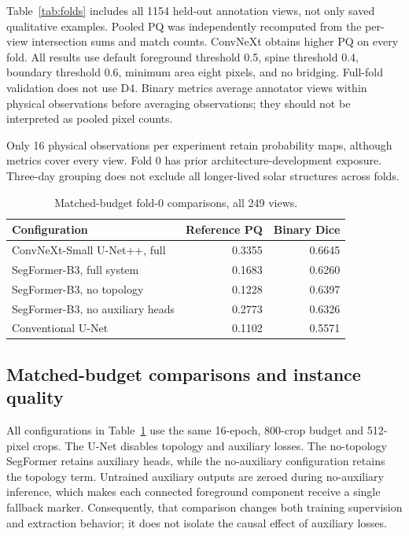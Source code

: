 \documentclass[conference]{IEEEtran}
\begin{document}
Table~\ref{tab:folds} includes all 1154 held-out annotation views, not only saved qualitative examples. Pooled PQ was independently recomputed from the per-view intersection sums and match counts. ConvNeXt obtains higher PQ on every fold. All results use default foreground threshold 0.5, spine threshold 0.4, boundary threshold 0.6, minimum area eight pixels, and no bridging. Full-fold validation does not use D4. Binary metrics average annotator views within physical observations before averaging observations; they should not be interpreted as pooled pixel counts.

Only 16 physical observations per experiment retain probability maps, although metrics cover every view. Fold 0 has prior architecture-development exposure. Three-day grouping does not exclude all longer-lived solar structures across folds.

\begin{table}[t]
\centering
\caption{Matched-budget fold-0 comparisons, all 249 views.}
\label{tab:ablations}
\footnotesize
\setlength{\tabcolsep}{3pt}
\begin{tabular*}{\columnwidth}{@{\extracolsep{\fill}}lrr@{}}
\toprule
Configuration & Reference PQ & Binary Dice\\
\midrule
ConvNeXt-Small U-Net++, full & 0.3355 & 0.6645\\
SegFormer-B3, full system & 0.1683 & 0.6260\\
SegFormer-B3, no topology & 0.1228 & 0.6397\\
SegFormer-B3, no auxiliary heads & 0.2773 & 0.6326\\
Conventional U-Net & 0.1102 & 0.5571\\
\bottomrule
\end{tabular*}
\end{table}

\subsection{Matched-budget comparisons and instance quality}
All configurations in Table~\ref{tab:ablations} use the same 16-epoch, 800-crop budget and 512-pixel crops. The U-Net disables topology and auxiliary losses. The no-topology SegFormer retains auxiliary heads, while the no-auxiliary configuration retains the topology term. Untrained auxiliary outputs are zeroed during no-auxiliary inference, which makes each connected foreground component receive a single fallback marker. Consequently, that comparison changes both training supervision and extraction behavior; it does not isolate the causal effect of auxiliary losses.
\end{document}
